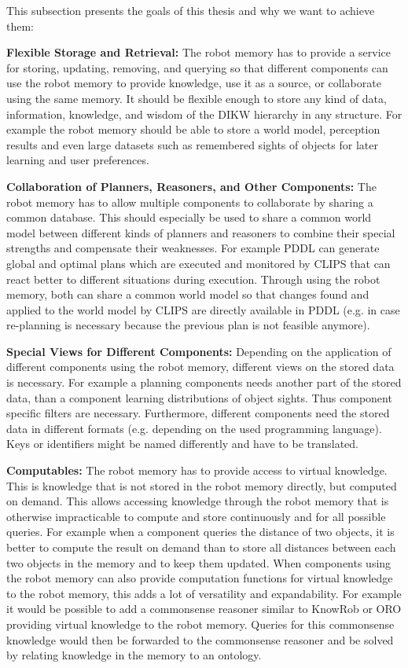 \documentclass[a4paper,11pt]{article}
\begin{document}
This subsection presents the goals of this thesis and why we want to
achieve them:

\smallskip
\textbf{Flexible Storage and Retrieval:} The robot memory has to
provide a service for storing, updating, removing, and querying so that
different components can use the robot memory to provide knowledge,
use it as a source, or collaborate using the same memory. It should be
flexible enough to store any kind of data, information, knowledge, and
wisdom of the DIKW hierarchy in any structure. For example the robot
memory should be able to store a world model, perception results and
even large datasets such as remembered sights of objects for later
learning and user preferences.

\smallskip
\textbf{Collaboration of Planners, Reasoners, and Other Components:}
The robot memory has to allow multiple components to collaborate by
sharing a common database. This should especially be used to share a
common world model between different kinds of planners and reasoners
to combine their special strengths and compensate their
weaknesses. For example PDDL can generate global and optimal plans
which are executed and monitored by CLIPS that can react better to
different situations during execution. Through using the robot memory,
both can share a common world model so that changes found and applied
to the world model by CLIPS are directly available in PDDL (e.g. in
case re-planning is necessary because the previous plan is not feasible
anymore).

\smallskip
\textbf{Special Views for Different Components:} Depending on the
application of different components using the robot memory, different
views on the stored data is necessary. For example a planning
components needs another part of the stored data, than a component
learning distributions of object sights. Thus component specific
filters are necessary. Furthermore, different components need the
stored data in different formats (e.g. depending on the used
programming language). Keys or identifiers might be named differently
and have to be translated.

\smallskip
\textbf{Computables:} The robot memory has to provide
access to virtual knowledge. This is knowledge that is not stored in
the robot memory directly, but computed on demand. This allows
accessing knowledge through the robot memory that is otherwise
impracticable to compute and store continuously and for all possible
queries. For example when a component queries the distance of two
objects, it is better to compute the result on demand
than to store all distances between each
two objects in the memory and to keep them updated.
When components using the robot memory can also provide computation
functions for virtual knowledge to the robot memory, this adds a lot of
versatility and expandability. For example it would be possible to add
a commonsense reasoner similar to KnowRob or ORO providing virtual
knowledge to the robot memory. Queries for this commonsense knowledge
would then be forwarded to the commonsense reasoner and be solved by
relating knowledge in the memory to an ontology.
\end{document}
